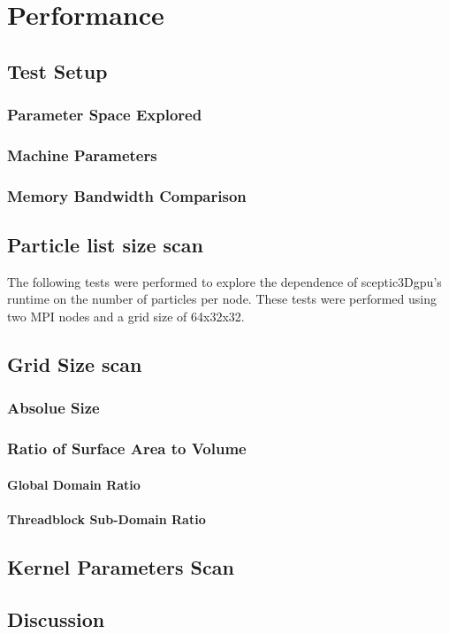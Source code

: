 \chapter{Performance} 

	\section{Test Setup}
		\subsection{Parameter Space Explored}
		\subsection{Machine Parameters}
		\subsection{Memory Bandwidth Comparison}
	
	\section{Particle list size scan}
The following tests were performed to explore the dependence of sceptic3Dgpu's runtime on the number of particles per node. These tests were performed using two MPI nodes and a grid size of 64x32x32.

	
	\section{Grid Size scan}
		\subsection{Absolue Size}
		\subsection{Ratio of Surface Area to Volume}
			\subsubsection{Global Domain Ratio}
			\subsubsection{Threadblock Sub-Domain Ratio}

	\section{Kernel Parameters Scan}

	\section{Discussion}
